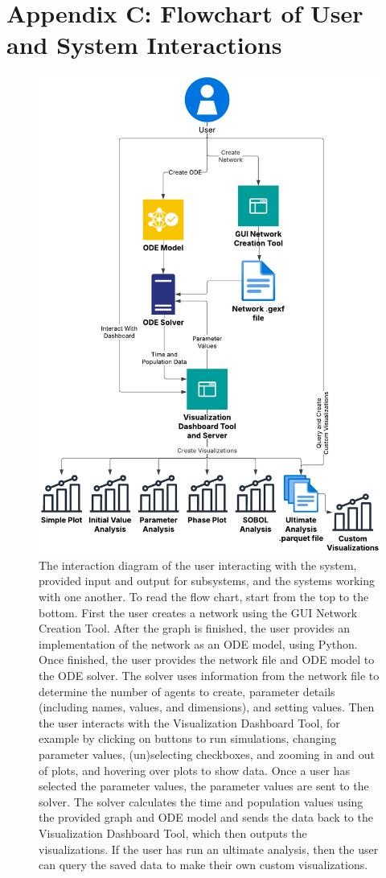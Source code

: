 \chapter{Appendix C: Flowchart of User and System Interactions}
\label{AppendixC}

\begin{figure}
    \centering
    \includegraphics[width=0.8\linewidth]{Images/interaction_diagram.pdf}
    \captionsetup{width=1\linewidth}
    \caption{
        The interaction diagram of the user interacting with the system, provided input and output for subsystems, and the systems working with one another. 
        To read the flow chart, start from the top to the bottom. 
        First the user creates a network using the GUI Network Creation Tool. 
        After the graph is finished, the user provides an implementation of the network as an ODE model, using Python. 
        Once finished, the user provides the network file and ODE model to the ODE solver. 
        The solver uses information from the network file to determine the number of agents to create, parameter details (including names, values, and dimensions), and setting values.
        Then the user interacts with the Visualization Dashboard Tool, for example by clicking on buttons to run simulations, changing parameter values, (un)selecting checkboxes, and zooming in and out of plots, and hovering over plots to show data. 
        Once a user has selected the parameter values, the parameter values are sent to the solver. 
        The solver calculates the time and population values using the provided graph and ODE model and sends the data back to the Visualization Dashboard Tool, which then outputs the visualizations. 
        If the user has run an ultimate analysis, then the user can query the saved data to make their own custom visualizations. 
    }
    \label{fig:interaction_diagram}
\end{figure} 